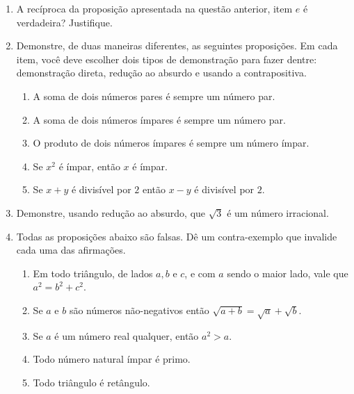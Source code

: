 \begin{enumerate}
    \item A recíproca da proposição apresentada na questão anterior, item $e$ é
      verdadeira? Justifique.

    \item Demonstre, de duas maneiras diferentes, as seguintes proposições. Em
      cada item, você deve escolher dois tipos de demonstração para fazer
      dentre: demonstração direta, redução ao absurdo e usando a
      contrapositiva.

      \begin{enumerate}

        \item A soma de dois números pares é sempre um número par.

        \item A soma de dois números ímpares é sempre um número par.

        \item O produto de dois números ímpares é sempre um número ímpar.

        \item Se $x^2$ é ímpar, então $x$ é ímpar.

        \item Se $x+y$ é divisível por $2$ então $x-y$ é divisível por $2$.

      \end{enumerate}

    \item Demonstre, usando redução ao absurdo, que $\sqrt{3}$ é um número
      irracional.

    \item Todas as proposições abaixo são falsas. Dê um contra-exemplo que
      invalide cada uma das afirmações.

      \begin{enumerate}

        \item Em todo triângulo, de lados $a,b$ e $c$, e com $a$ sendo o maior
          lado, vale que $a^2=b^2+c^2$.

        \item Se $a$ e $b$ são números não-negativos então $\sqrt{a+b}=
          \sqrt{a}+ \sqrt{b}$.

        \item Se $a$ é um número real qualquer, então $a^2>a$.

        \item Todo número natural ímpar é primo.

        \item Todo triângulo é retângulo.

     \end{enumerate}
\end{enumerate}

